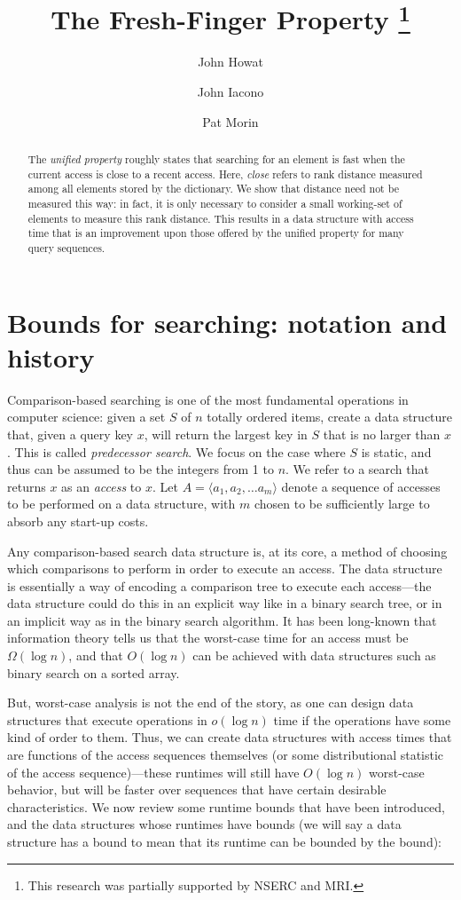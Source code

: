 \documentclass{llncs}
\title{The Fresh-Finger Property \thanks{This research was partially supported by NSERC and MRI.}}
\author{John Howat\inst{1} \and John Iacono\inst{2} \and Pat Morin\inst{3}}
\institute{School of Computing\\Queen's University\\\email{howat@cs.queensu.ca}
\and Department of Computer Science and Engineering\\Polytechnic Institute of New York University\\\email{jiacono@poly.edu} \and
School of Computer Science\\Carleton University\\\email{morin@scs.carleton.ca}}
\newcommand{\BigOh}[1]{O\!\left(#1\right)}
\newcommand{\LittleOh}[1]{o\!\left(#1\right)}
\newcommand{\BigOmega}[1]{\Omega\!\left(#1\right)}
\begin{document}
\maketitle
\thispagestyle{plain}
\begin{abstract}
The \emph{unified property} roughly states that searching for an element is fast when the current access is close to a recent access. Here, \emph{close} refers to rank distance measured among all elements stored by the dictionary. We show that distance need not be measured this way: in fact, it is only necessary to consider a small working-set of elements to measure this rank distance. This results in a data structure with access time that is an improvement upon those offered by the unified property for many query sequences.
\end{abstract}



\section{Bounds for searching: notation and history}

Comparison-based searching is one of the most fundamental operations in computer science: given a set $S$ of $n$ totally ordered items, create a data structure that, given a query key $x$, will return the largest key in $S$ that is no larger than $x$. This is called \emph{predecessor search}. We focus on the case where $S$ is static, and thus can be assumed to be the integers from 1 to $n$. We refer to a search that returns $x$ as an \emph{access} to $x$. Let $A = \langle a_1, a_2, \ldots a_m \rangle$ denote a sequence of accesses to be performed on a data structure, with $m$ chosen to be sufficiently large to absorb any start-up costs.

Any comparison-based search data structure is, at its core, a method of choosing which comparisons to perform in order to execute an access. The data structure is essentially a way of encoding a comparison tree to execute each access---the data structure could do this in an explicit way like in a binary search tree, or in an implicit way as in the binary search algorithm. It has been long-known that information theory tells us that the worst-case time for an access must be $\BigOmega{\log n}$, and that $\BigOh{\log n}$ can be achieved with data structures such as binary search on a sorted array.

But, worst-case analysis is not the end of the story, as one can design data structures that execute operations in $\LittleOh{\log n}$ time if the operations have some kind of order to them. Thus, we can create data structures with access times that are functions of the access sequences themselves (or some distributional statistic of the access sequence)---these runtimes will still have $\BigOh{\log n}$ worst-case behavior, but will be faster over sequences that have certain desirable characteristics. We now review some runtime bounds that have been introduced, and the data structures whose runtimes have bounds (we will say a data structure has a bound to mean that its runtime can be bounded by the bound):
\end{document}
